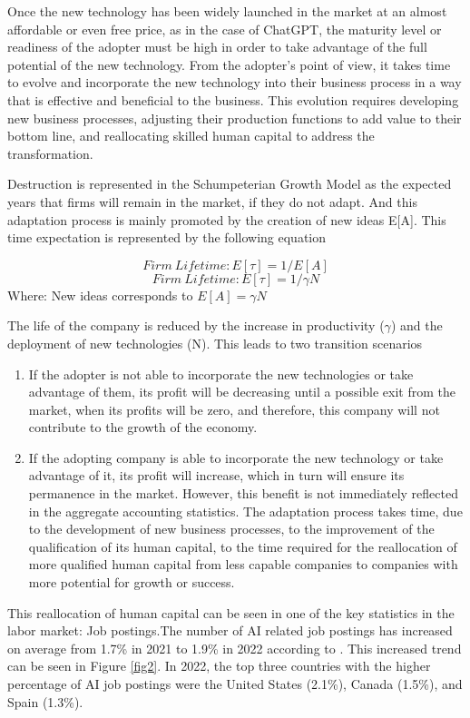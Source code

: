 \documentclass[preprint, 3p,
authoryear]{elsarticle} %
\begin{document}
Once the new technology has been widely launched in the market at an
almost affordable or even free price, as in the case of ChatGPT, the
maturity level or readiness of the adopter must be high in order to take
advantage of the full potential of the new technology. From the
adopter's point of view, it takes time to evolve and incorporate the new
technology into their business process in a way that is effective and
beneficial to the business. This evolution requires developing new
business processes, adjusting their production functions to add value to
their bottom line, and reallocating skilled human capital to address the
transformation.

Destruction is represented in the Schumpeterian Growth Model as the
expected years that firms will remain in the market, if they do not
adapt. And this adaptation process is mainly promoted by the creation of
new ideas E{[}A{]}. This time expectation is represented by the
following equation

\[
Firm \ Lifetime: E[\tau] = 1/E[A]
\] \[
Firm \ Lifetime: E[\tau] = 1/\gamma N
\] Where: New ideas corresponds to \(E[A] = \gamma N\)

The life of the company is reduced by the increase in productivity
(\(\gamma\)) and the deployment of new technologies (N). This leads to
two transition scenarios

\begin{enumerate}
\def\labelenumi{\arabic{enumi}.}
\item
  If the adopter is not able to incorporate the new technologies or take
  advantage of them, its profit will be decreasing until a possible exit
  from the market, when its profits will be zero, and therefore, this
  company will not contribute to the growth of the economy.
\item
  If the adopting company is able to incorporate the new technology or
  take advantage of it, its profit will increase, which in turn will
  ensure its permanence in the market. However, this benefit is not
  immediately reflected in the aggregate accounting statistics. The
  adaptation process takes time, due to the development of new business
  processes, to the improvement of the qualification of its human
  capital, to the time required for the reallocation of more qualified
  human capital from less capable companies to companies with more
  potential for growth or success.
\end{enumerate}

This reallocation of human capital can be seen in one of the key
statistics in the labor market: Job postings.The number of AI related
job postings has increased on average from 1.7\% in 2021 to 1.9\% in
2022 according to \citep{reportAI}. This increased trend can be seen in
Figure \ref{fig2}. In 2022, the top three countries with the higher
percentage of AI job postings were the United States (2.1\%), Canada
(1.5\%), and Spain (1.3\%).
\end{document}
